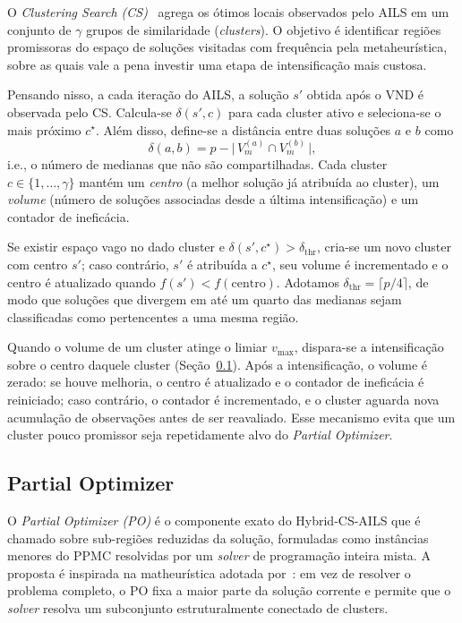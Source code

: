 \documentclass[a4paper,11pt]{article}
\begin{document}
O \textit{Clustering Search (CS)}~\cite{oliveira2013clustering, souto2021hybrid} agrega os ótimos locais observados pelo AILS em um conjunto de $\gamma$ grupos de similaridade (\textit{clusters}). O objetivo é identificar regiões promissoras do espaço de soluções visitadas com frequência pela metaheurística, sobre as quais vale a pena investir uma etapa de intensificação mais custosa.

Pensando nisso, a cada iteração do AILS, a solução $s'$ obtida após o VND é observada pelo CS. Calcula-se $\delta(s', c)$ para cada cluster ativo e seleciona-se o mais próximo $c^{\star}$. Além disso, define-se a distância entre duas soluções $a$ e $b$ como
\begin{equation}
\delta(a, b) = p - \bigl|\, V_m^{(a)} \cap V_m^{(b)}\,\bigr|,
\label{eq:cs_distance}
\end{equation}
i.e., o número de medianas que não são compartilhadas. Cada cluster $c \in \{1, \ldots, \gamma\}$ mantém um \emph{centro} (a melhor solução já atribuída ao cluster), um \emph{volume} (número de soluções associadas desde a última intensificação) e um contador de ineficácia.

Se existir espaço vago no dado cluster e $\delta(s', c^{\star}) > \delta_{\mathrm{thr}}$, cria-se um novo cluster com centro $s'$; caso contrário, $s'$ é atribuída a $c^{\star}$, seu volume é incrementado e o centro é atualizado quando $f(s') < f(\mathrm{centro})$. Adotamos $\delta_{\mathrm{thr}} = \lceil p/4 \rceil$, de modo que soluções que divergem em até um quarto das medianas sejam classificadas como pertencentes a uma mesma região.



Quando o volume de um cluster atinge o limiar $v_{\max}$, dispara-se a intensificação sobre o centro daquele cluster (Seção~\ref{subsec:po}). Após a intensificação, o volume é zerado: se houve melhoria, o centro é atualizado e o contador de ineficácia é reiniciado; caso contrário, o contador é incrementado, e o cluster aguarda nova acumulação de observações antes de ser reavaliado. Esse mecanismo evita que um cluster pouco promissor seja repetidamente alvo do \textit{Partial Optimizer}.

\subsection{Partial Optimizer}
\label{subsec:po}

O \textit{Partial Optimizer (PO)} é o componente exato do Hybrid-CS-AILS que é chamado sobre sub-regiões reduzidas da solução, formuladas como instâncias menores do PPMC resolvidas por um \textit{solver} de programação inteira mista. A proposta é inspirada na matheurística adotada por~\cite{stefanello2015matheuristics}: em vez de resolver o problema completo, o PO fixa a maior parte da solução corrente e permite que o \textit{solver} resolva um subconjunto estruturalmente conectado de clusters.
\end{document}
